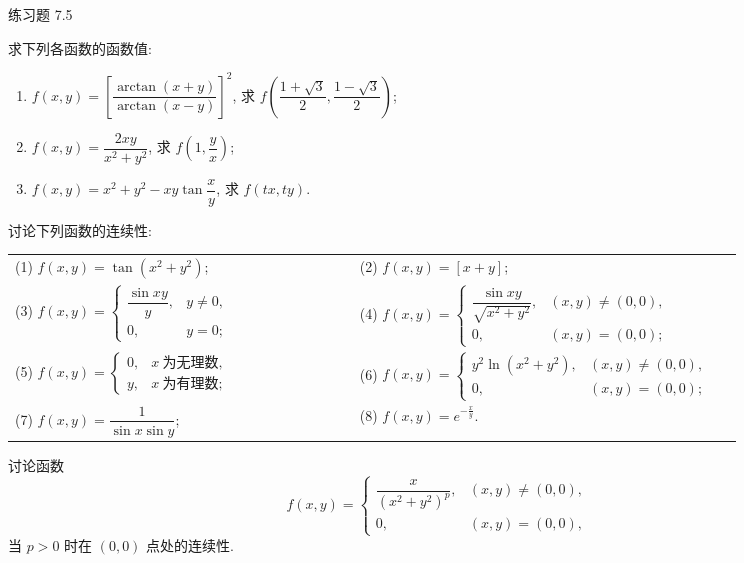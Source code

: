 \begin{exblock}{练习题 7.5}
  \item 求下列各函数的函数值:
  \begin{enumerate}
    \item $f(x, y) = \left[\dfrac{\arctan(x + y)}{\arctan(x - y)}\right]^{2}$, 求 $f\left(\dfrac{1 + \sqrt{3}}{2}, \dfrac{1 - \sqrt{3}}{2}\right)$;
    \item $f(x, y) = \dfrac{2xy}{x^{2} + y^{2}}$, 求 $f\left(1, \dfrac{y}{x}\right)$;
    \item $f(x, y) = x^{2} + y^{2} - xy\tan\dfrac{x}{y}$, 求 $f(tx, ty)$.
  \end{enumerate}

  \item 讨论下列函数的连续性:

  \begin{tabular}{@{}p{0.45\linewidth}p{0.50\linewidth}@{}}
    (1) $f(x, y) = \tan(x^{2} + y^{2})$; & (2) $f(x, y) = [x + y]$; \\[2mm]
    (3) $f(x, y) =
      \begin{cases}
        \dfrac{\sin xy}{y}, & y \neq 0, \\[2mm]
        0, & y = 0;
      \end{cases}$
    & (4) $f(x, y) =
      \begin{cases}
        \dfrac{\sin xy}{\sqrt{x^{2} + y^{2}}}, & (x, y) \neq (0, 0), \\[2mm]
        0, & (x, y) = (0, 0);
      \end{cases}$ \\[4mm]
    (5) $f(x, y) =
      \begin{cases}
        0, & x\ \text{为无理数}, \\[2mm]
        y, & x\ \text{为有理数};
      \end{cases}$
    & (6) $f(x, y) =
      \begin{cases}
        y^{2}\ln(x^{2} + y^{2}), & (x, y) \neq (0, 0), \\[2mm]
        0, & (x, y) = (0, 0);
      \end{cases}$ \\[4mm]
    (7) $f(x, y) = \dfrac{1}{\sin x\sin y}$; & (8) $f(x, y) = e^{-\frac{x}{y}}$.
  \end{tabular}

  \item 讨论函数
  \[
    f(x, y) =
    \begin{cases}
      \dfrac{x}{(x^{2} + y^{2})^{p}}, & (x, y) \neq (0, 0), \\[2.5mm]
      0, & (x, y) = (0, 0),
    \end{cases}
  \]
  当 $p > 0$ 时在 $(0, 0)$ 点处的连续性.
\end{exblock}

